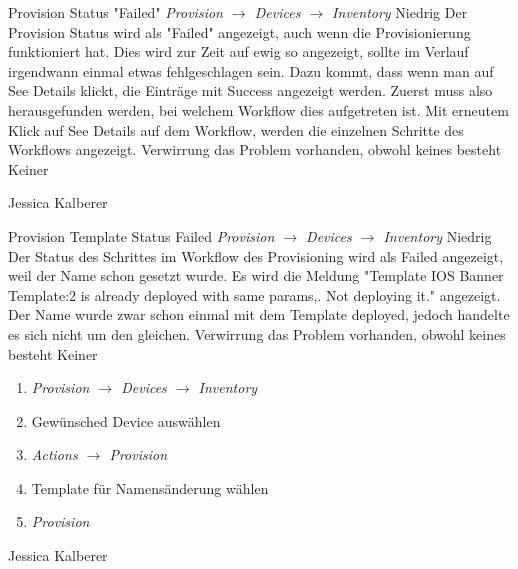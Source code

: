 \bugreport
{Provision Status "Failed"}
{\textit{ Provision $\rightarrow$ Devices $\rightarrow$ Inventory}}
{Niedrig}
{Der Provision Status wird als "Failed" angezeigt, auch wenn die Provisionierung funktioniert hat. Dies wird zur Zeit auf ewig so angezeigt, sollte im Verlauf irgendwann einmal etwas fehlgeschlagen sein. Dazu kommt, dass wenn man auf See Details klickt, die Einträge mit Success angezeigt werden. Zuerst muss also herausgefunden werden, bei welchem Workflow dies aufgetreten ist. Mit erneutem Klick auf See Details auf dem Workflow, werden die einzelnen Schritte des Workflows angezeigt.
}
{Verwirrung das Problem vorhanden, obwohl keines besteht}
{Keiner}
{
	
}
{Jessica Kalberer}
{}


\bugreport
{Provision Template Status Failed}
{\textit{ Provision $\rightarrow$ Devices $\rightarrow$ Inventory}}
{Niedrig}
{Der Status des Schrittes im Workflow des Provisioning wird als Failed angezeigt, weil der Name schon gesetzt wurde. Es wird die Meldung "Template IOS Banner Template:2 is already deployed with same params,. Not deploying it." angezeigt. Der Name wurde zwar schon einmal mit dem Template deployed, jedoch handelte es sich nicht um den gleichen.
}
{Verwirrung das Problem vorhanden, obwohl keines besteht}
{Keiner}
{
	\begin{enumerate}
		\item \textit{Provision $\rightarrow$ Devices $\rightarrow$ Inventory}
		\item Gewünsched Device auswählen
		\item \textit{Actions $\rightarrow$ Provision}
		\item Template für Namensänderung wählen
		\item \textit{Provision}
	\end{enumerate}
}
{Jessica Kalberer}
{}
